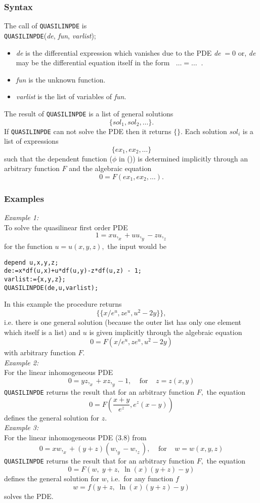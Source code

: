 \subsubsection{Syntax}
The call of \texttt{QUASILINPDE} is \\
\texttt{QUASILINPDE}(\textit{de}, \textit{fun}, \textit{varlist});
\begin{itemize}
\item
\textit{de} is the differential expression which vanishes due to the PDE
\textit{de}$\; = 0$ or, \textit{de} may be the differential equation itself in the
form $\;\;\ldots = \ldots\;\;$.
\item
\textit{fun} is the unknown function.
\item
\textit{varlist} is the list of variables of \textit{fun}.
\end{itemize}
The result of \texttt{QUASILINPDE} is a list of general solutions
\[      \{\textit{sol}_1, \textit{sol}_2, \ldots \}.  \]
If \texttt{QUASILINPDE} can not solve the PDE then it returns $\{\}$.
Each solution $\textit{sol}_i$ is a list of expressions
\[      \{\textit{ex}_1, \textit{ex}_2, \ldots \}  \]
such that the dependent function ($\phi$ in ()) is determined
implicitly through an arbitrary function $F$ and the algebraic
equation \[ 0 = F(\textit{ex}_1, \textit{ex}_2, \ldots). \]
\subsubsection{Examples}
\emph{Example 1:}\\
To solve the quasilinear first order PDE \[1 = xu,_x + uu,_y - zu,_z\]
for the function $u = u(x,y,z),$ the input would be
\begin{small}
\begin{verbatim}
depend u,x,y,z;
de:=x*df(u,x)+u*df(u,y)-z*df(u,z) - 1;
varlist:={x,y,z};
QUASILINPDE(de,u,varlist);
\end{verbatim}
\end{small}
In this example the procedure returns
\[\{ \{ x/e^u, ze^u, u^2 - 2y \} \},\]
i.e. there is one general solution (because the outer list has only one
element which itself is a list) and $u$ is given implicitly through
the algebraic equation
\[ 0 = F(x/e^u, ze^u, u^2 - 2y)\]
with arbitrary function $F.$ \\
\emph{Example 2:}\\
For the linear inhomogeneous PDE
\[ 0 = y z,_x + x z,_y - 1, \;\;\;\;\mbox{for}\;\;\;\;z=z(x,y)\]
\texttt{QUASILINPDE} returns the result that for an arbitrary function $F,$ the
equation
\[ 0 = F\left(\frac{x+y}{e^z},e^z(x-y)\right) \]
defines the general solution for $z$. \\
\emph{Example 3:}\\
For the linear inhomogeneous PDE (3.8) from \cite{Kamke:Vol1}
\[ 0 = x w,_x + (y+z)(w,_y - w,_z), \;\;\;\;\mbox{for}\;\;\;\;w=w(x,y,z)\]
\texttt{QUASILINPDE} returns the result
that for an arbitrary function $F,$ the equation
\[ 0 = F\left(w, \;y+z, \;\ln(x)(y+z)-y\right) \]
defines the general solution for $w$, i.e.\ for any function $f$
\[ w = f\left(y+z, \;\ln(x)(y+z)-y\right) \]
solves the PDE.
